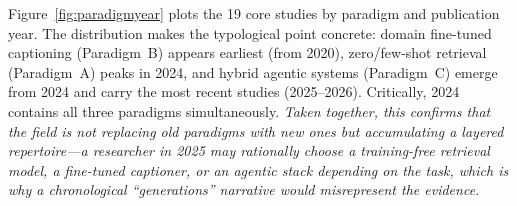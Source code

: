 \documentclass[10pt,letterpaper]{article}
\begin{document}
\begin{figure}[H]
\end{figure}

Figure~\ref{fig:paradigmyear} plots the 19 core studies by paradigm and publication year. The distribution makes the typological point concrete: domain fine-tuned captioning (Paradigm~B) appears earliest (from 2020), zero/few-shot retrieval (Paradigm~A) peaks in 2024, and hybrid agentic systems (Paradigm~C) emerge from 2024 and carry the most recent studies (2025--2026). Critically, 2024 contains all three paradigms simultaneously. \textit{Taken together, this confirms that the field is not replacing old paradigms with new ones but accumulating a layered repertoire---a researcher in 2025 may rationally choose a training-free retrieval model, a fine-tuned captioner, or an agentic stack depending on the task, which is why a chronological ``generations'' narrative would misrepresent the evidence.}
\end{document}

